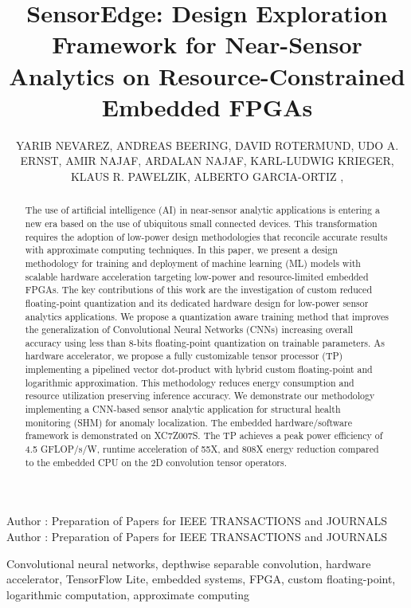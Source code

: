 \title {SensorEdge: Design Exploration Framework for Near-Sensor Analytics on Resource-Constrained Embedded FPGAs}

\author{
	\uppercase{Yarib Nevarez},
	\uppercase{Andreas Beering},	
	\uppercase{David Rotermund},
	\uppercase{Udo A. Ernst},
	\uppercase{Amir Najaf},
	\uppercase{Ardalan Najaf},
	\uppercase{Karl-Ludwig Krieger},
	\uppercase{Klaus R. Pawelzik},
	\uppercase{Alberto Garcia-Ortiz} ,
}


\markboth
{Author \headeretal: Preparation of Papers for IEEE TRANSACTIONS and JOURNALS}
{Author \headeretal: Preparation of Papers for IEEE TRANSACTIONS and JOURNALS}


\begin{abstract}
The use of artificial intelligence (AI) in near-sensor analytic applications is entering a new era based on the use of ubiquitous small connected devices. This transformation requires the adoption of low-power design methodologies that reconcile accurate results with approximate computing techniques. In this paper, we present a design methodology for training and deployment of machine learning (ML) models with scalable hardware acceleration targeting low-power and resource-limited embedded FPGAs. The key contributions of this work are the investigation of custom reduced floating-point quantization and its dedicated hardware design for low-power sensor analytics applications. We propose a quantization aware training method that improves the generalization of Convolutional Neural Networks (CNNs) increasing overall accuracy using less than 8-bits floating-point quantization on trainable parameters. As hardware accelerator, we propose a fully customizable tensor processor (TP) implementing a pipelined vector dot-product with hybrid custom floating-point and logarithmic approximation. This methodology reduces energy consumption and resource utilization preserving inference accuracy. We demonstrate our methodology implementing a CNN-based sensor analytic application for structural health monitoring (SHM) for anomaly localization. The embedded hardware/software framework is demonstrated on XC7Z007S. The TP achieves a peak power efficiency of 4.5 GFLOP/s/W, runtime acceleration of 55X, and 808X energy reduction compared to the embedded CPU on the 2D convolution tensor operators.
\end{abstract}

\begin{keywords}
Convolutional neural networks, depthwise separable convolution, hardware accelerator, TensorFlow Lite, embedded systems, FPGA, custom floating-point, logarithmic computation, approximate computing
\end{keywords}

\titlepgskip=-15pt

\maketitle